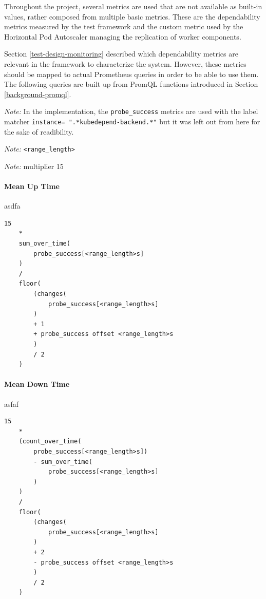 Throughout the project, several metrics are used that are not available as built-in values, rather composed from multiple basic metrics. These are the dependability metrics measured by the test framework and the custom metric used by the Horizontal Pod Autoscaler managing the replication of worker components.

 Section \ref{test-design-monitoring} described which dependability metrics are relevant in the framework to characterize the system. However, these metrics should be mapped to actual Prometheus queries in order to be able to use them. The following queries are built up from PromQL functions introduced in Section \ref{background-promql}.
 

\emph{Note:} In the implementation, the \texttt{probe\_success} metrics are used with the label matcher \texttt{instance=~".*kubedepend-backend.*"} but it was left out from here for the sake of readibility.

\emph{Note:} \texttt{<range\_length>}

\emph{Note:} multiplier 15
 
 \paragraph{Mean Up Time} asdfa
 
 \vspace{0.5cm}
 \begin{minipage}{\linewidth}
 	\begin{lstlisting}[caption={Mean Up Time defined in PromQL}, label={lst:promql-mut}]
 	15
 	* 
 	sum_over_time(
 		probe_success[<range_length>s]
 	)
 	/ 
 	floor(
 		(changes(
 			probe_success[<range_length>s]
 		)
 		+ 1
 		+ probe_success offset <range_length>s
 		)
 		/ 2
 	)
 	\end{lstlisting}
 \end{minipage}
 
 \paragraph{Mean Down Time} asfaf
 
 \vspace{0.5cm}
 \begin{minipage}{\linewidth}
 	\begin{lstlisting}[caption={Mean Up Time defined in PromQL}, label={lst:promql-mut}]
 	15 
 	* 
 	(count_over_time(
 		probe_success[<range_length>s])
 		- sum_over_time(
 			probe_success[<range_length>s]
 		)
 	)
 	/ 
 	floor(
 		(changes(
 			probe_success[<range_length>s]
 		)
 		+ 2
 		- probe_success offset <range_length>s
 		)
 		/ 2
 	)
 	\end{lstlisting}
 \end{minipage}
 

